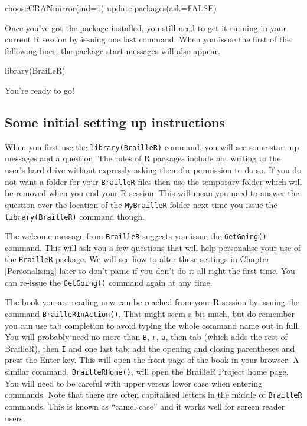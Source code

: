 \documentclass[
]{book}
\newenvironment{Shaded}{\begin{snugshade}}{\end{snugshade}}
\newcommand{\AttributeTok}[1]{\textcolor[rgb]{0.77,0.63,0.00}{#1}}
\newcommand{\ConstantTok}[1]{\textcolor[rgb]{0.00,0.00,0.00}{#1}}
\newcommand{\DecValTok}[1]{\textcolor[rgb]{0.00,0.00,0.81}{#1}}
\newcommand{\FunctionTok}[1]{\textcolor[rgb]{0.00,0.00,0.00}{#1}}
\newcommand{\NormalTok}[1]{#1}
\begin{document}
\begin{Shaded}
\begin{Highlighting}[]
\FunctionTok{chooseCRANmirror}\NormalTok{(}\AttributeTok{ind=}\DecValTok{1}\NormalTok{)}
\FunctionTok{update.packages}\NormalTok{(}\AttributeTok{ask=}\ConstantTok{FALSE}\NormalTok{)}
\end{Highlighting}
\end{Shaded}

Once you've got the package installed, you still need to get it running in your current R session by issuing one last command. When you issue the first of the following lines, the package start messages will also appear.

\begin{Shaded}
\begin{Highlighting}[]
\FunctionTok{library}\NormalTok{(BrailleR)}
\end{Highlighting}
\end{Shaded}

You're ready to go!

\hypertarget{some-initial-setting-up-instructions}{%
\subsection{Some initial setting up instructions}\label{some-initial-setting-up-instructions}}

When you first use the \texttt{library(BrailleR)} command, you will see some start up messages and a question. The rules of R packages include not writing to the user's hard drive without expressly asking them for permission to do so. If you do not want a folder for your \texttt{BrailleR} files then use the temporary folder which will be removed when you end your R session. This will mean you need to answer the question over the location of the \texttt{MyBrailleR} folder next time you issue the \texttt{library(BrailleR)} command though.

The welcome message from \texttt{BrailleR} suggests you issue the \texttt{GetGoing()} command. This will ask you a few questions that will help personalise your use of the \texttt{BrailleR} package. We will see how to alter these settings in Chapter \ref{Personalising} later so don't panic if you don't do it all right the first time. You can re-issue the \texttt{GetGoing()} command again at any time.

The book you are reading now can be reached from your R session by issuing the command \texttt{BrailleRInAction()}. That might seem a bit much, but do remember you can use tab completion to avoid typing the whole command name out in full. You will probably need no more than \texttt{B}, \texttt{r}, \texttt{a}, then tab (which adds the rest of BrailleR), then \texttt{I} and one last tab; add the opening and closing parentheses and press the Enter key. This will open the front page of the book in your browser. A similar command, \texttt{BrailleRHome()}, will open the BrailleR Project home page. You will need to be careful with upper versus lower case when entering commands. Note that there are often capitalised letters in the middle of \texttt{BrailleR} commands. This is known as ``camel case'' and it works well for screen reader users.
\end{document}
